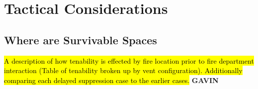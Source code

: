 \documentclass[12pt,oneside]{book}
\begin{document}





\clearpage

\chapter{Tactical Considerations}

\section{Where are Survivable Spaces}
\hl{A description of how tenability is effected by fire location prior to fire department interaction (Table of tenability broken up by vent configuration). Additionally comparing each delayed suppression case to the earlier cases.} \textbf{GAVIN}
\end{document}
